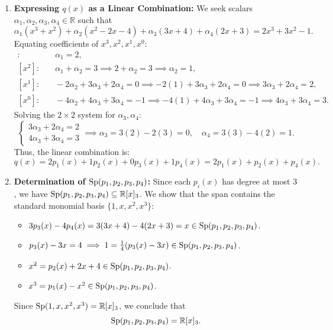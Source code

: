 \begin{exercisesolution*}
\label{sol:polynomial_linear_combination_span}
\begin{enumerate}[label=\textbf{(\alph*)}]
    \item \textbf{Expressing $q(x)$ as a Linear Combination:}
    We seek scalars $\alpha_1, \alpha_2, \alpha_3, \alpha_4 \in \mathbb{R}$ such that
    \[
    \alpha_1 (x^3 + x^2) + \alpha_2 (x^2 - 2x - 4) + \alpha_3 (3x + 4) + \alpha_4 (2x + 3) = 2x^3 + 3x^2 - 1.
    \]
    Equating coefficients of $x^3, x^2, x^1, x^0$:
    \begin{align*}
    [x^3]: & \quad \alpha_1 = 2, \\
    [x^2]: & \quad \alpha_1 + \alpha_2 = 3 \implies 2 + \alpha_2 = 3 \implies \alpha_2 = 1, \\
    [x^1]: & \quad -2\alpha_2 + 3\alpha_3 + 2\alpha_4 = 0 \implies -2(1) + 3\alpha_3 + 2\alpha_4 = 0 \implies 3\alpha_3 + 2\alpha_4 = 2, \\
    [x^0]: & \quad -4\alpha_2 + 4\alpha_3 + 3\alpha_4 = -1 \implies -4(1) + 4\alpha_3 + 3\alpha_4 = -1 \implies 4\alpha_3 + 3\alpha_4 = 3.
    \end{align*}
    Solving the $2 \times 2$ system for $\alpha_3, \alpha_4$:
    \[
    \begin{cases}
    3\alpha_3 + 2\alpha_4 = 2 \\
    4\alpha_3 + 3\alpha_4 = 3
    \end{cases}
    \implies
    \alpha_3 = 3(2) - 2(3) = 0, \quad \alpha_4 = 3(3) - 4(2) = 1.
    \]
    Thus, the linear combination is:
    \[
    q(x) = 2 p_1(x) + 1 p_2(x) + 0 p_3(x) + 1 p_4(x) = 2 p_1(x) + p_2(x) + p_4(x).
    \]

    \item \textbf{Determination of $\operatorname{Sp}(p_1, p_2, p_3, p_4)$:}
    Since each $p_i(x)$ has degree at most $3$, we have $\operatorname{Sp}(p_1, p_2, p_3, p_4) \subseteq \mathbb{R}[x]_3$. We show that the span contains the standard monomial basis $\{1, x, x^2, x^3\}$:
    \begin{itemize}
        \item $3 p_3(x) - 4 p_4(x) = 3(3x + 4) - 4(2x + 3) = x \in \operatorname{Sp}(p_1, p_2, p_3, p_4)$.
        \item $p_3(x) - 3x = 4 \implies 1 = \frac{1}{4}(p_3(x) - 3x) \in \operatorname{Sp}(p_1, p_2, p_3, p_4)$.
        \item $x^2 = p_2(x) + 2x + 4 \in \operatorname{Sp}(p_1, p_2, p_3, p_4)$.
        \item $x^3 = p_1(x) - x^2 \in \operatorname{Sp}(p_1, p_2, p_3, p_4)$.
    \end{itemize}
    Since $\operatorname{Sp}(1, x, x^2, x^3) = \mathbb{R}[x]_3$, we conclude that
    \[
    \operatorname{Sp}(p_1, p_2, p_3, p_4) = \mathbb{R}[x]_3.
    \]
\end{enumerate}
\end{exercisesolution*}


